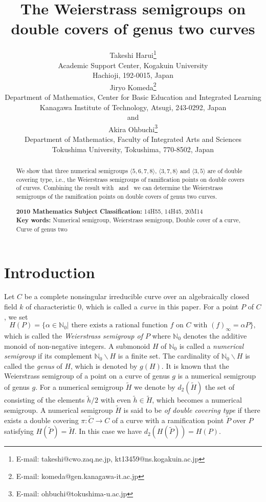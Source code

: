 \documentclass[a4paper,12pt]{article}
\title{The Weierstrass semigroups on double covers of genus two curves}
\author{
Takeshi Harui\thanks{E-mail: takeshi@cwo.zaq.ne.jp, kt13459@ns.kogakuin.ac.jp}\\
{\small Academic Support Center, Kogakuin University}\\
{\small  Hachioji, 192-0015, Japan}\\
Jiryo Komeda\thanks{E-mail: komeda@gen.kanagawa-it.ac.jp}\\
{\small Department of Mathematics, Center for Basic Education and Integrated Learning}\\
{\small Kanagawa Institute of Technology, Atsugi, 243-0292, Japan}\\
and\\
Akira Ohbuchi\thanks{E-mail: ohbuchi@tokushima-u.ac.jp}\\
{\small Department of Mathematics, Faculty of Integrated Arts and Sciences}\\
{\small Tokushima University, Tokushima, 770-8502, Japan}\\
}
\date{}
\renewcommand{\labelenumi}{(\theenumi)}  %
\newcommand{\tH}{\tilde{H}}
\newcommand{\tP}{\tilde{P}}
\newcommand{\tih}{\tilde{h}}
\newcommand{\la}{\langle}
\newcommand{\ra}{\rangle}
\begin{document}
\maketitle
\renewcommand{\thefootnote}{\fnsymbol{footnote}}
\renewcommand{\abstractname}{}
\begin{abstract}\vskip-2mm
We show that three numerical semigroups $\la 5,6,7,8 \ra$, $\la 3,7,8 \ra$ and $\la 3,5 \ra$ are of double covering type, i.e., the Weierstrass semigroups of ramification points on double covers of curves.
Combining the result with~\cite{oli-pim} and~\cite{kom2} we can determine the Weierstrass semigroups of the ramification points on double covers of genus two curves.

\vspace{2mm} \noindent 
{\bf 2010 Mathematics Subject
Classification:} 14H55, 14H45, 20M14 \\
{\bf Key words:} Numerical semigroup, Weierstrass semigroup, Double cover of a curve, Curve of genus two
\end{abstract}
\section{Introduction}
\label{intro}
Let $C$ be a complete nonsingular irreducible curve over an algebraically closed field $k$ of characteristic 0, which is called a {\it
curve} in this paper.
For a point $P$ of $C$, we set
$$H(P)=\{\alpha\in \mathbb{N}_{0}|\mbox{ there exists a rational function } f \mbox{ on }C\mbox{ with } (f)_{\infty}=\alpha P\},$$
which is called the {\it Weierstrass semigroup of $P$} where $\mathbb{N}_{0}$ denotes the additive monoid of non-negative integers.
A submonoid $H$ of $\mathbb{N}_0$ is called a {\it numerical semigroup} if its complement $\mathbb{N}_0\backslash H$ is a finite set.
The cardinality of $\mathbb{N}_0\backslash H$ is called the {\it genus} of $H$, which is denoted by $g(H)$.
It is known that the Weierstrass semigroup of a point on a curve of genus $g$ is a numerical semigroup of genus $g$.
For a numerical semigroup $\tH$ we denote by $d_2(\tH)$ the set of consisting of the elements  $\tih/2$ with even $\tih\in \tH$, which becomes a numerical semigroup.
A numerical semigroup $\tH$ is said to be {\it of double covering type} if there exists a double covering $\pi:{\tilde C}\longrightarrow C$ of a curve with a ramification point $\tP$ over $P$ satisfying $H(\tP)=\tH$.
In this case we have $d_2(H(\tP))=H(P)$.
\end{document}
